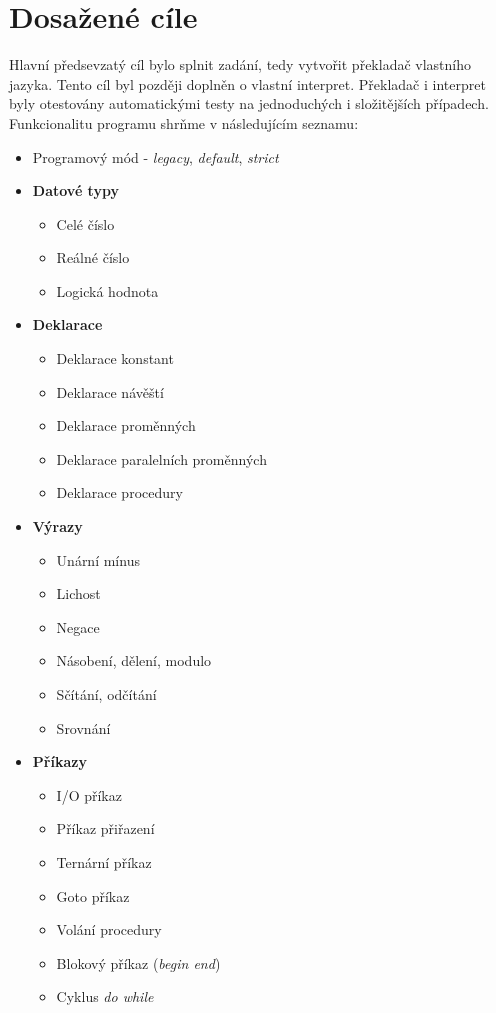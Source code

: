 \documentclass[
12pt,
a4paper,
pdftex,
czech,
titlepage
]{report}
\begin{document}
\section{Dosažené cíle}

Hlavní předsevzatý cíl bylo splnit zadání, tedy vytvořit překladač vlastního jazyka. Tento cíl byl později doplněn o vlastní interpret. Překladač i interpret byly otestovány automatickými testy na jednoduchých i složitějších případech. Funkcionalitu programu shrňme v následujícím seznamu:
\begin{itemize}
\item Programový mód - \textit{legacy}, \textit{default}, \textit{strict}
\item \textbf{Datové typy}
\begin{itemize}
\item Celé číslo
\item Reálné číslo
\item Logická hodnota
\end{itemize}
\item \textbf{Deklarace}
\begin{itemize}
\item Deklarace konstant
\item Deklarace návěští
\item Deklarace proměnných
\item Deklarace paralelních proměnných
\item Deklarace procedury
\end{itemize}
\item \textbf{Výrazy}
\begin{itemize}
\item Unární mínus
\item Lichost
\item Negace
\item Násobení, dělení, modulo
\item Sčítání, odčítání
\item Srovnání
\end{itemize}
\item \textbf{Příkazy}
\begin{itemize}
\item I/O příkaz
\item Příkaz přiřazení
\item Ternární příkaz
\item Goto příkaz
\item Volání procedury
\item Blokový příkaz (\textit{begin end})
\item Cyklus \textit{do while}

\end{itemize}
\end{itemize}
\end{document}
